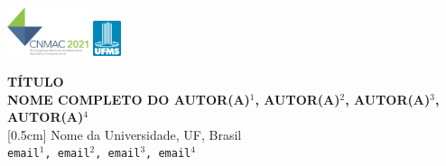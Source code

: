 \documentclass[a0,portrait]{a0poster}
\begin{document}
\onehalfspacing


\begin{center}
\vspace*{-3.8cm}
    \includegraphics[width=0.18\textwidth]{logo} 
	\hspace{55.5cm}
	\includegraphics[width=0.06\textwidth]{ufms} 
\vspace{1,5cm}
\end{center}

\begin{minipage}[b]{1.0\linewidth} %
\begin{center}
\Huge \textbf{T\'ITULO}\\
\huge \textbf{NOME COMPLETO DO AUTOR(A)$^{1}$, AUTOR(A)$^{2}$, AUTOR(A)$^{3}$, AUTOR(A)$^{4}$}\\
[0.5cm] %
\huge Nome da Universidade, UF, Brasil\\[0.4cm] %
\Large \texttt{email$^{1}$, email$^{2}$, email$^{3}$, email$^{4}$}\\
\end{center}
\end{minipage}
%
\vspace{1cm} %
\end{document}
